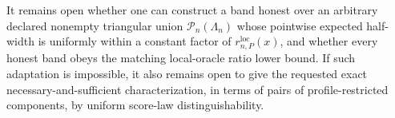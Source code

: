 It remains open whether one can construct a band honest over an arbitrary declared nonempty triangular union \(\mathcal P_n(\Lambda_n)\) whose pointwise expected half-width is uniformly within a constant factor of \(r_{n,P}^{\mathrm{loc}}(x)\), and whether every honest band obeys the matching local-oracle ratio lower bound.  If such adaptation is impossible, it also remains open to give the requested exact necessary-and-sufficient characterization, in terms of pairs of profile-restricted components, by uniform score-law distinguishability.